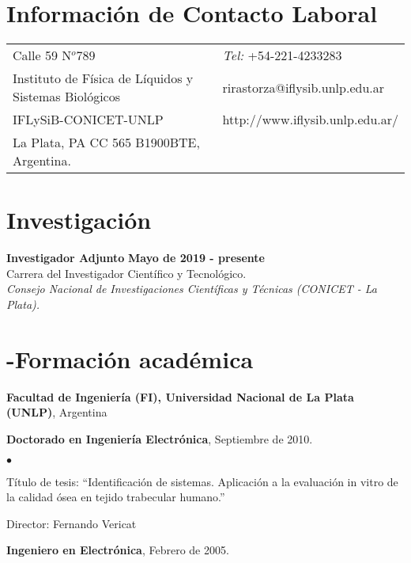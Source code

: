 \documentclass[margin,line]{res}
\newenvironment{list1}{
  \begin{list}{\ding{113}}{%
      \setlength{\itemsep}{0in}
      \setlength{\parsep}{0in} \setlength{\parskip}{0in}
      \setlength{\topsep}{0in} \setlength{\partopsep}{0in} 
      \setlength{\leftmargin}{0.17in}}}{\end{list}}
\newenvironment{list2}{
  \begin{list}{$\bullet$}{%
      \setlength{\itemsep}{0in}
      \setlength{\parsep}{0in} \setlength{\parskip}{0in}
      \setlength{\topsep}{0in} \setlength{\partopsep}{0in} 
      \setlength{\leftmargin}{0.2in}}}{\end{list}}
\begin{document}

\begin{resume}
\section{\sc Información de Contacto Laboral}
\vspace{.05in}
\begin{tabular}{@{}p{3.5in}p{3in}}
Calle 59 N$^o789$             & {\it Tel:} +54-221-4233283 \\            
Instituto de Física de Líquidos y Sistemas Biológicos & rirastorza@iflysib.unlp.edu.ar\\         
IFLySiB-CONICET-UNLP & http://www.iflysib.unlp.edu.ar/ \\       
La Plata, PA CC 565 B1900BTE, Argentina. & \\     
\end{tabular}

% 


\section{\sc Investigación}

{\bf Investigador Adjunto } \hfill {\bf Mayo de 2019  - presente}\\
 Carrera del Investigador Científico y Tecnológico.\\
{\em Consejo Nacional de Investigaciones Científicas y Técnicas (CONICET - La Plata).}\\

\section{-Formación académica}
{\bf Facultad de Ingeniería (FI), Universidad Nacional de La Plata (UNLP)}, Argentina\\
\vspace*{.1in}
\begin{list1}
\item[] \textbf{Doctorado en Ingeniería Electrónica}, Septiembre de 2010.
\begin{list2}
\vspace*{.1in}
\item Título de tesis:  ``Identificación de sistemas. Aplicación a la evaluación in vitro de la calidad ósea en tejido trabecular humano.'' 
\item Director:  Fernando Vericat
\end{list2}
\vspace*{.3in}
\item[] \textbf{Ingeniero en Electrónica}, Febrero de 2005.
\end{list1}


\end{resume}
\end{document}

